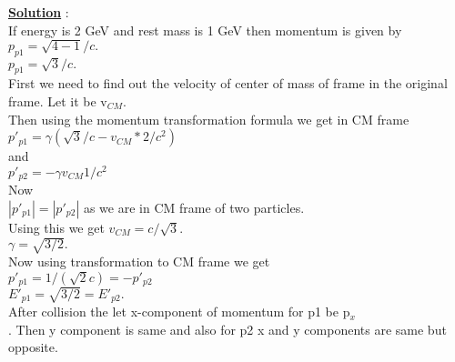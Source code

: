 \documentclass[10pt, a4paper]{article}
\begin{document}
\begin{enumerate}
{{\underline {\bf Solution}} : \\
If energy is 2 GeV and rest mass is 1 GeV then momentum is given by\\
\begin{math} p_{p1} = \sqrt{4-1} / c. \end{math}\\
\begin{math} p_{p1} = \sqrt3 / c.\end{math}\\
First we need to find out the velocity of center of mass of frame in the original frame. Let it be v\begin{math}_{CM}\end{math}.\\
Then using the momentum transformation formula we get in CM frame\\
\begin{math} p'_{p1} = \gamma (\sqrt3/c - v_{CM}*2/c^2) \end{math}\\
and \\
\begin{math} p'_{p2} = -\gamma v_{CM} 1/c^2 \end{math}\\
Now\\
\begin{math} |p'_{p1}| = |p'_{p2}| \end{math} as we are in CM frame of two particles.\\
Using this we get
\begin{math} v_{CM} = c/\sqrt3. \end{math}\\
\begin{math} \gamma = \sqrt{3/2}. \end{math}\\
Now using transformation to CM frame we get\\
\begin{math} p'_{p1} = 1/(\sqrt2 c) = -p'_{p2}\end{math}\\
\begin{math} E'_{p1} = \sqrt{3/2} = E'_{p2}.\end{math}\\
After collision the let x-component of momentum for p1 be p\begin{math} _x\end{math}\\.
Then y component is same and also for p2 x and y components are same but opposite.\\
}
\end{enumerate}
\end{document}
